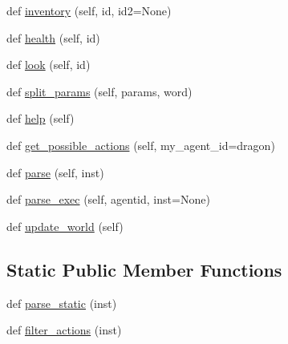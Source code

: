 \begin{DoxyCompactItemize}
\item 
def \hyperlink{classprojects_1_1mastering__the__dungeon_1_1tasks_1_1graph__world2_1_1graph_1_1Graph_a3f929c89e9ca47b66c8851490a518f5e}{inventory} (self, id, id2=None)
\item 
def \hyperlink{classprojects_1_1mastering__the__dungeon_1_1tasks_1_1graph__world2_1_1graph_1_1Graph_a94d0e8825af02aaf8de5f328a644b8c4}{health} (self, id)
\item 
def \hyperlink{classprojects_1_1mastering__the__dungeon_1_1tasks_1_1graph__world2_1_1graph_1_1Graph_a2a896bf212e0f87f0c5765d2cc249617}{look} (self, id)
\item 
def \hyperlink{classprojects_1_1mastering__the__dungeon_1_1tasks_1_1graph__world2_1_1graph_1_1Graph_a07dc981149e210b044bdb2faa8d437a9}{split\+\_\+params} (self, params, word)
\item 
def \hyperlink{classprojects_1_1mastering__the__dungeon_1_1tasks_1_1graph__world2_1_1graph_1_1Graph_a36381674cd448a339870939d058fe0ae}{help} (self)
\item 
def \hyperlink{classprojects_1_1mastering__the__dungeon_1_1tasks_1_1graph__world2_1_1graph_1_1Graph_a0d9e8f386ec8cb4a8b1235f8e7f7086d}{get\+\_\+possible\+\_\+actions} (self, my\+\_\+agent\+\_\+id=\textquotesingle{}dragon\textquotesingle{})
\item 
def \hyperlink{classprojects_1_1mastering__the__dungeon_1_1tasks_1_1graph__world2_1_1graph_1_1Graph_a965691173de36efdc59238a2cd5ab8d7}{parse} (self, inst)
\item 
def \hyperlink{classprojects_1_1mastering__the__dungeon_1_1tasks_1_1graph__world2_1_1graph_1_1Graph_afdbdcd09ae2a8b3d66cf70fabfbdf86f}{parse\+\_\+exec} (self, agentid, inst=None)
\item 
def \hyperlink{classprojects_1_1mastering__the__dungeon_1_1tasks_1_1graph__world2_1_1graph_1_1Graph_a23324301e21091e84366d23c626d8125}{update\+\_\+world} (self)
\end{DoxyCompactItemize}
\subsection*{Static Public Member Functions}
\begin{DoxyCompactItemize}
\item 
def \hyperlink{classprojects_1_1mastering__the__dungeon_1_1tasks_1_1graph__world2_1_1graph_1_1Graph_a81ec4b7a30f8a6eaa6ed1e72da629299}{parse\+\_\+static} (inst)
\item 
def \hyperlink{classprojects_1_1mastering__the__dungeon_1_1tasks_1_1graph__world2_1_1graph_1_1Graph_aaeefec1f409cbe2ce0f4531c353264a6}{filter\+\_\+actions} (inst)
\end{DoxyCompactItemize}


